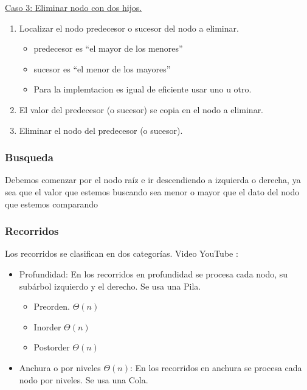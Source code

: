 \documentclass[../main.tex]{subfiles}
\begin{document}
            \underline{Caso 3: Eliminar nodo con dos hijos.}
            \begin{enumerate}
                \item Localizar el nodo predecesor o sucesor del nodo a eliminar.
                    \begin{itemize}
                        \item predecesor es “el mayor de los menores”
                        \item sucesor es “el menor de los mayores”
                        \item Para la implemtacion es igual de eficiente usar uno u otro.
                    \end{itemize}
                \item El valor del predecesor (o sucesor) se copia en el nodo a eliminar.
                \item Eliminar el nodo del predecesor (o sucesor).
            \end{enumerate}

        \subsubsection{Busqueda} 
            Debemos comenzar por el nodo raíz e ir descendiendo a izquierda o derecha, ya sea que el valor que estemos buscando sea menor o mayor que el dato del nodo que estemos comparando

        \subsubsection{Recorridos} 
            Los recorridos se clasifican en dos categorías. Video YouTube \cite{ABB-Recorridos_youtube}:
            \begin{itemize}
                \item Profundidad: En los recorridos en profundidad se procesa cada nodo, su subárbol izquierdo y el derecho. Se usa una Pila.
                    \begin{itemize}
                        \item Preorden. $\Theta(n)$
                        \item Inorder $\Theta(n)$
                        \item Postorder $\Theta(n)$
                    \end{itemize}
                \item Anchura o por niveles $\Theta(n)$: En los recorridos en anchura se procesa cada nodo por niveles. Se usa una Cola.
            \end{itemize} 
        
\end{document}
